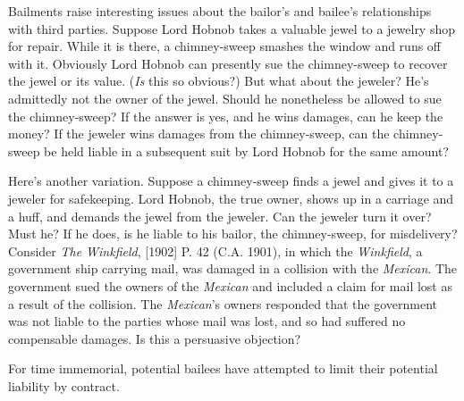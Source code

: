 %

\item Bailments raise interesting issues about the bailor's and bailee's
relationships with third parties. Suppose Lord Hobnob takes a valuable jewel to
a jewelry shop for repair. While it is there, a chimney-sweep smashes the
window and runs off with it. Obviously Lord Hobnob can presently sue the
chimney-sweep to recover the jewel or its value. (\textit{Is} this so obvious?)
But what about the jeweler? He's admittedly not the owner of the jewel. Should
he nonetheless be allowed to sue the chimney-sweep? If the answer is yes, and
he wins damages, can he keep the money? If the jeweler wins damages from the
chimney-sweep, can the chimney-sweep be held liable in a subsequent suit by
Lord Hobnob for the same amount?


\item Here's another variation. Suppose a chimney-sweep finds a jewel and gives
it to a jeweler for safekeeping. Lord Hobnob, the true owner, shows up in a
carriage and a huff, and demands the jewel from the jeweler. Can the jeweler
turn it over? Must he? If he does, is he liable to his bailor, the
chimney-sweep, for misdelivery? Consider \textit{The Winkfield}, [1902] P. 42
(C.A. 1901), in which the \textit{Winkfield}, a government ship carrying mail,
was damaged in a collision with the \textit{Mexican}. The government sued the
owners of the \textit{Mexican} and included a claim for mail lost as a result
of the collision. The \textit{Mexican}{}'s owners responded that the government
was not liable to the parties whose mail was lost, and so had suffered no
compensable damages. Is this a persuasive objection?


\item For time immemorial, potential bailees have attempted to limit their
potential liability by contract.

